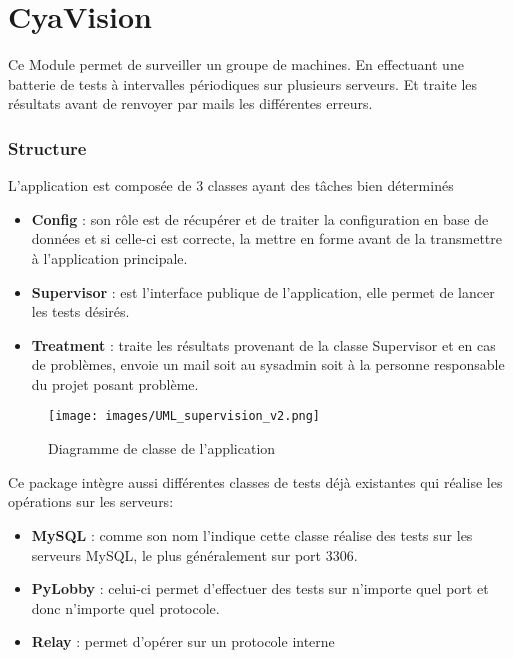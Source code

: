 \part*{CyaVision}

Ce Module permet de surveiller un groupe de machines. En effectuant une batterie de tests à intervalles périodiques sur plusieurs serveurs. Et traite les résultats avant de renvoyer par mails les différentes erreurs.

\section*{Structure}

L'application est composée de 3 classes ayant des tâches bien déterminés

\begin{itemize}
	\item \textbf{Config} : son rôle est de récupérer et de traiter la configuration en base de données et si celle-ci est correcte, la mettre en forme avant de la transmettre à l'application principale. 
	\item \textbf{Supervisor} : est l'interface publique de l'application, elle permet de lancer les tests désirés.
	\item \textbf{Treatment} : traite les résultats provenant de la classe Supervisor et en cas de problèmes, envoie un mail soit au sysadmin soit à la personne responsable du projet posant problème. 
\end{itemize}

\begin{figure}[h!]
	\centering
	\texttt{[image: images/UML\_supervision\_v2.png]}
	\caption{Diagramme de classe de l'application}
\end{figure}

Ce package intègre aussi différentes classes de tests déjà existantes qui réalise les opérations sur les serveurs:

\begin{itemize}
	\item \textbf{MySQL} : comme son nom l'indique cette classe réalise des tests sur les serveurs MySQL, le plus généralement sur port 3306.
	\item \textbf{PyLobby} : celui-ci permet d'effectuer des tests sur n'importe quel port et donc n'importe quel protocole.
	\item \textbf{Relay} : permet d'opérer sur un protocole interne 
\end{itemize}

